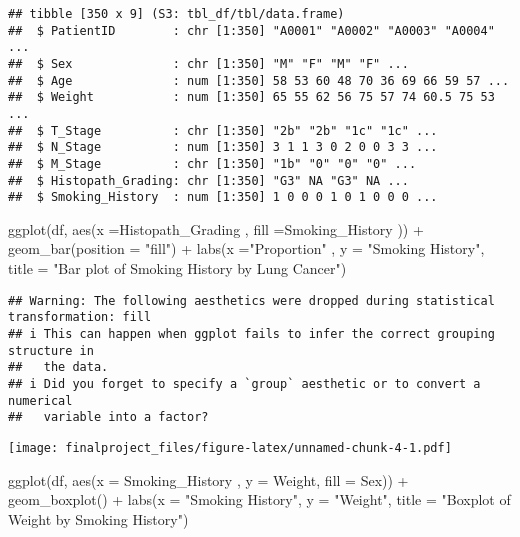 \documentclass[
]{article}
\newenvironment{Shaded}{\begin{snugshade}}{\end{snugshade}}
\newcommand{\AttributeTok}[1]{\textcolor[rgb]{0.77,0.63,0.00}{#1}}
\newcommand{\FunctionTok}[1]{\textcolor[rgb]{0.00,0.00,0.00}{#1}}
\newcommand{\NormalTok}[1]{#1}
\newcommand{\SpecialCharTok}[1]{\textcolor[rgb]{0.00,0.00,0.00}{#1}}
\newcommand{\StringTok}[1]{\textcolor[rgb]{0.31,0.60,0.02}{#1}}
\begin{document}
\begin{verbatim}
## tibble [350 x 9] (S3: tbl_df/tbl/data.frame)
##  $ PatientID        : chr [1:350] "A0001" "A0002" "A0003" "A0004" ...
##  $ Sex              : chr [1:350] "M" "F" "M" "F" ...
##  $ Age              : num [1:350] 58 53 60 48 70 36 69 66 59 57 ...
##  $ Weight           : num [1:350] 65 55 62 56 75 57 74 60.5 75 53 ...
##  $ T_Stage          : chr [1:350] "2b" "2b" "1c" "1c" ...
##  $ N_Stage          : num [1:350] 3 1 1 3 0 2 0 0 3 3 ...
##  $ M_Stage          : chr [1:350] "1b" "0" "0" "0" ...
##  $ Histopath_Grading: chr [1:350] "G3" NA "G3" NA ...
##  $ Smoking_History  : num [1:350] 1 0 0 0 1 0 1 0 0 0 ...
\end{verbatim}

\begin{Shaded}
\begin{Highlighting}[]
\FunctionTok{ggplot}\NormalTok{(df, }\FunctionTok{aes}\NormalTok{(}\AttributeTok{x =}\NormalTok{Histopath\_Grading , }\AttributeTok{fill =}\NormalTok{Smoking\_History )) }\SpecialCharTok{+}
  \FunctionTok{geom\_bar}\NormalTok{(}\AttributeTok{position =} \StringTok{"fill"}\NormalTok{) }\SpecialCharTok{+}
  \FunctionTok{labs}\NormalTok{(}\AttributeTok{x =}\StringTok{"Proportion"}\NormalTok{ , }\AttributeTok{y =} \StringTok{"Smoking History"}\NormalTok{, }\AttributeTok{title =} \StringTok{"Bar plot of Smoking History by Lung Cancer"}\NormalTok{)}
\end{Highlighting}
\end{Shaded}

\begin{verbatim}
## Warning: The following aesthetics were dropped during statistical transformation: fill
## i This can happen when ggplot fails to infer the correct grouping structure in
##   the data.
## i Did you forget to specify a `group` aesthetic or to convert a numerical
##   variable into a factor?
\end{verbatim}

\texttt{[image: finalproject\_files/figure-latex/unnamed-chunk-4-1.pdf]}

\begin{Shaded}
\begin{Highlighting}[]
\FunctionTok{ggplot}\NormalTok{(df, }\FunctionTok{aes}\NormalTok{(}\AttributeTok{x =}\NormalTok{ Smoking\_History , }\AttributeTok{y =}\NormalTok{ Weight, }\AttributeTok{fill =}\NormalTok{ Sex)) }\SpecialCharTok{+}
  \FunctionTok{geom\_boxplot}\NormalTok{() }\SpecialCharTok{+}
  \FunctionTok{labs}\NormalTok{(}\AttributeTok{x =} \StringTok{"Smoking History"}\NormalTok{, }\AttributeTok{y =} \StringTok{"Weight"}\NormalTok{, }\AttributeTok{title =} \StringTok{"Boxplot of Weight by Smoking History"}\NormalTok{)}
\end{Highlighting}
\end{Shaded}
\end{document}
